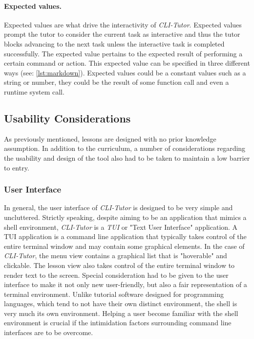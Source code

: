 \paragraph{Expected values.} Expected values are what drive the interactivity
of \textit{CLI-Tutor}. Expected values prompt the tutor to consider the current
task as interactive and thus the tutor blocks advancing to the next task unless
the interactive task is completed successfully. The expected value pertains to
the expected result of performing a certain command or action. This expected
value can be specified in three different ways (see: \autoref{lst:markdown}).
Expected values could be a constant values such as a string or number, they
could be the result of some function call and even a runtime system call.

\subsection{Usability Considerations}

As previously mentioned, lessons are designed with no prior knowledge
assumption. In addition to the curriculum, a number of considerations regarding
the usability and design of the tool also had to be taken to maintain a low
barrier to entry.

\subsubsection{User Interface} In general, the user interface of
\textit{CLI-Tutor} is designed to be very simple and uncluttered. Strictly
speaking, despite aiming to be an application that mimics a shell environment,
\textit{CLI-Tutor} is a \textit{TUI} or "Text User Interface" application. A
TUI application is a command line application that typically takes control of
the entire terminal window and may contain some graphical elements. In the case
of \textit{CLI-Tutor}, the menu view contains a graphical list that is
"hoverable" and clickable. The lesson view also takes control of the entire
terminal window to render text to the screen. Special consideration had to be given
to the user interface to make it not only new user-friendly, but also a fair
representation of a terminal environment. Unlike tutorial software designed for
programming languages, which tend to not have their own distinct environment,
the shell is very much its own environment. Helping a user become familiar with
the shell environment is crucial if the intimidation factors surrounding
command line interfaces are to be overcome.

